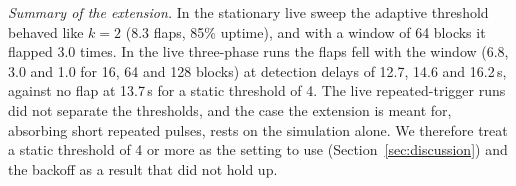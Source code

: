 \emph{Summary of the extension.} In the stationary live sweep the adaptive threshold
behaved like $k{=}2$ (8.3 flaps, 85\% uptime), and with a window of 64 blocks it
flapped 3.0 times. In the live three-phase runs the flaps fell with the window (6.8,
3.0 and 1.0 for 16, 64 and 128 blocks) at detection delays of 12.7, 14.6 and
16.2\,s, against no flap at 13.7\,s for a static threshold of 4. The live
repeated-trigger runs did not separate the thresholds, and the case the extension is
meant for, absorbing short repeated pulses, rests on the simulation alone. We
therefore treat a static threshold of 4 or more as the setting to use
(Section~\ref{sec:discussion}) and the backoff as a result that did not hold up.

\FloatBarrier
